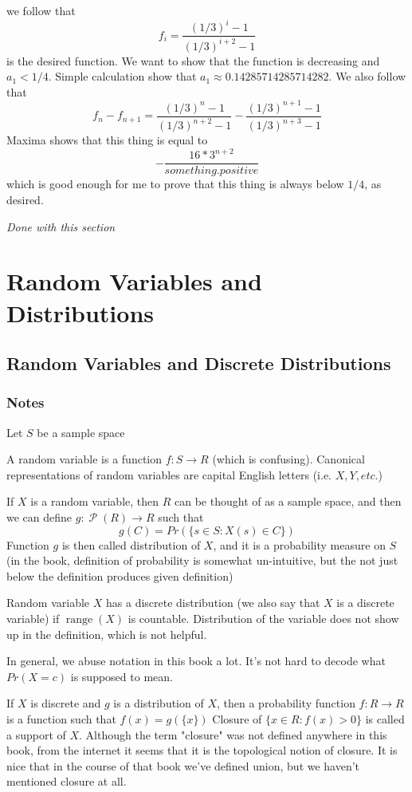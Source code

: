 \documentclass[11pt,oneside,titlepage]{book}
\DeclareMathOperator \pow {\mathcal {P}}
\DeclareMathOperator \range {range}
\newcommand{\set}[1]{\{ #1 \}}
\begin{document}
we follow that
$$f_i = \frac{(1/3)^i - 1}{(1/3)^{i + 2} - 1}$$
is the desired function. We want to show that the function is decreasing and $a_1 < 1/4$.
Simple calculation show that $a_1 \approx 0.14285714285714282$. We also follow that
$$f_n - f_{n + 1} = \frac{(1/3)^n - 1}{(1/3)^{n + 2} - 1} -
\frac{(1/3)^{n + 1} - 1}{(1/3)^{n + 3} - 1}$$
Maxima shows that this thing is equal to
$$- \frac{16 * 3^{n + 2}}{something . positive}$$
which is good enough for me to prove that this thing is always below $1/4$, as desired.

\textit{Done with this section}

\chapter{Random Variables and Distributions}

\section{Random Variables and Discrete Distributions}

\subsection*{Notes}

Let $S$ be a sample space

A random variable is a function $f: S \to R$ (which is confusing). Canonical representations
of random variables are capital English letters (i.e. $X, Y, etc.$)

If $X$ is a random variable, then $R$ can be thought of as a sample space, and then
we can define $g: \pow(R) \to R$ such that
$$g(C) = Pr(\set{s \in S: X(s) \in C})$$
Function $g$ is then called distribution of $X$, and it is a probability measure on $S$
(in the book, definition of probability is somewhat un-intuitive, but the not just below the
definition produces given definition)

Random variable $X$ has a discrete distribution (we also say that $X$ is a discrete variable)
if $\range(X)$ is countable. Distribution of the variable does not show up in the definition, which
is not helpful.

In general, we abuse notation in this book a lot. It's not hard to decode what $Pr(X = c)$ is
supposed to mean.

If $X$ is discrete and $g$ is a distribution of $X$,
then a probability function $f: R \to R$ is a function such that
$f(x) = g(\set{x})$
Closure of $\set{x \in R: f(x) > 0}$ is called a support of $X$. 
Although the term "closure" was not defined anywhere in this book, from the internet it seems that
it is the topological notion of closure. It is nice that in the course of that book we've defined
union, but we haven't mentioned closure at all.
\end{document}

